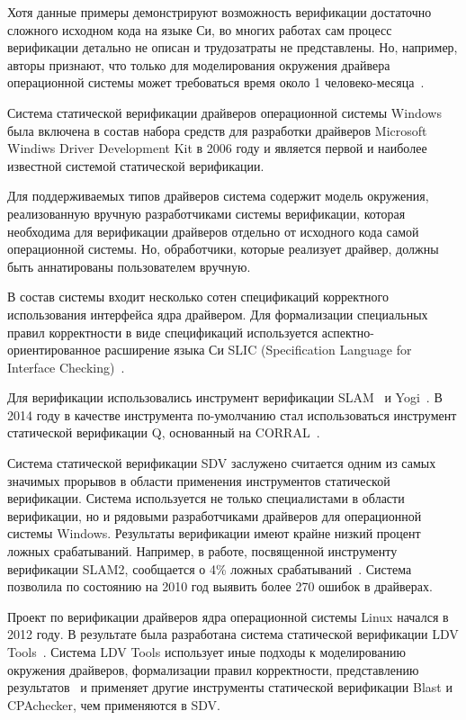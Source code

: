 \documentclass[%
candidate,     %
href,        %
colorlinks,  %
]{disser}
\begin{document}
Хотя данные примеры демонстрируют возможность верификации достаточно сложного исходном кода на языке Си, во многих работах сам процесс верификации детально не описан и трудозатраты не представлены.
Но, например, авторы признают, что только для моделирования окружения драйвера операционной системы может требоваться время около 1 человеко-месяца~\cite{ConcurBugsRakamaric}.

Система статической верификации драйверов операционной системы Windows была включена в состав набора средств для разработки драйверов Microsoft Windiws Driver Development Kit в 2006 году и является первой и наиболее известной системой статической верификации.

Для поддерживаемых типов драйверов система содержит модель окружения, реализованную вручную разработчиками системы верификации, которая необходима для верификации драйверов отдельно от исходного кода самой операционной системы.
Но, обработчики, которые реализует драйвер, должны быть аннатированы пользователем вручную. 

В состав системы входит несколько сотен спецификаций корректного использования интерфейса ядра драйвером.
Для формализации специальных правил корректности в виде спецификаций используется аспектно-ориентированное расширение языка Си SLIC (Specification Language for Interface Checking)~\cite{SLIC}.

Для верификации использовались инструмент верификации SLAM~\cite{Ball:2011:DSM} и Yogi~\cite{Yogi}.
В 2014 году в качестве инструмента по-умолчанию стал использоваться инструмент статической верификации Q, основанный на CORRAL~\cite{Lal:2014:PSD}. 

Система статической верификации SDV заслужено считается одним из самых значимых прорывов в области применения инструментов статической верификации.
Система используется не только специалистами в области верификации, но и рядовыми разработчиками драйверов для операционной системы Windows.
Результаты верификации имеют крайне низкий процент ложных срабатываний. Например, в работе, посвященной инструменту верификации SLAM2, сообщается о 4\% ложных срабатываний~\cite{SLAM2}.
Система позволила по состоянию на 2010 год выявить более 270 ошибок в драйверах.

Проект по верификации драйверов ядра операционной системы Linux начался в 2012 году.
В результате была разработана система статической верификации LDV Tools~\cite{Beyer:2012:LDV}.
Система LDV Tools использует иные подходы к моделированию окружения драйверов, формализации правил корректности, представлению результатов~\cite{configurable:Trudy, Zakharov2015} и применяет другие инструменты статической верификации Blast и CPAchecker, чем применяются в SDV. 
\end{document}
